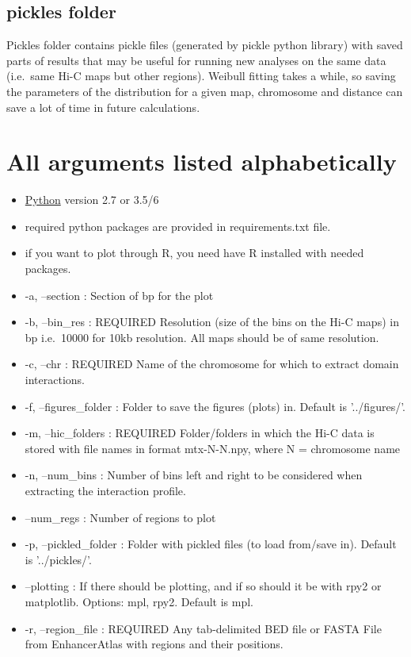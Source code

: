 \subsection{pickles folder}
Pickles folder contains pickle files (generated by pickle python library) with saved parts of results that may be useful
for running new analyses on the same data (i.e.~same Hi-C maps but other regions). Weibull fitting takes a while, so
saving the parameters of the distribution for a given map, chromosome and distance can save a lot of time in future
calculations.

\section{All arguments listed alphabetically}
\label{sec:arguments}
\begin{itemize}
\item \href{https://www.python.org}{Python} version 2.7 or 3.5/6
\item required python packages are provided in requirements.txt file.
\item if you want to plot through R, you need have R installed with needed packages.
\item -a, --section : Section of bp for the plot
\item -b, --bin\_res : REQUIRED Resolution (size of the bins on the Hi-C maps) in bp i.e.~10000 for 10kb resolution. All maps
should be of same resolution.
\item -c, --chr : REQUIRED Name of the chromosome for which to extract domain interactions.
\item -f, --figures\_folder : Folder to save the figures (plots) in. Default is '../figures/'.
\item -m, --hic\_folders : REQUIRED Folder/folders in which the Hi-C data is stored with file names in format mtx-N-N.npy, where N =
chromosome name
\item -n, --num\_bins : Number of bins left and right to be considered when extracting the interaction profile.
\item --num\_regs : Number of regions to plot
\item -p, --pickled\_folder : Folder with pickled files (to load from/save in). Default is '../pickles/'.
\item --plotting : If there should be plotting, and if so should it be with rpy2 or matplotlib. Options: mpl, rpy2. Default is mpl.
\item -r, --region\_file : REQUIRED Any tab-delimited BED file or FASTA File from EnhancerAtlas with regions and their positions.

\end{itemize}
